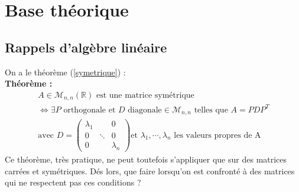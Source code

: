 \documentclass[a4paper,10pt]{report}
\begin{document}
\newpage
\section{Base théorique}
\subsection{Rappels d'algèbre linéaire}
\noindent On a le théorème (\ref{symetrique}) :\\
\textbf{Théorème :}
\begin{equation}
\label{symetrique}
\begin{array}{l}
A \in \mathcal{M}_{n,n}(\mathbb{R}) \text{ est une matrice symétrique} \\
\Leftrightarrow \exists P \text{ orthogonale et } D \text{ diagonale} \in \mathcal{M}_{n,n} \text{ telles que } A=PDP^T \\
\text{avec } D = \left( \begin{array}{ccc} \lambda_1 & & 0 \\ 0 & \ddots & 0 \\ 0 & & \lambda_n \end{array} \right) \text{et } \lambda_1, \cdots, \lambda_n \text{ les valeurs propres de A}
\end{array}
\end{equation}
Ce théorème, très pratique, ne peut toutefois s'appliquer que sur des matrices carrées et symétriques. Dés lors, que faire lorsqu'on est confronté à des matrices qui ne respectent pas ces conditions ?
\end{document}

